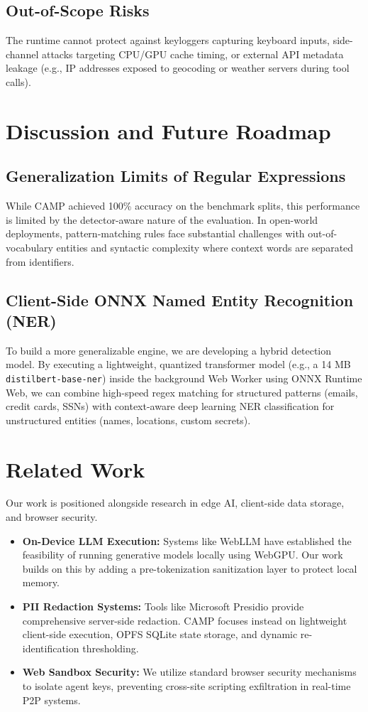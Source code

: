 \documentclass[conference]{IEEEtran}
\begin{document}
\subsection{Out-of-Scope Risks}
The runtime cannot protect against keyloggers capturing keyboard inputs, side-channel attacks targeting CPU/GPU cache timing, or external API metadata leakage (e.g., IP addresses exposed to geocoding or weather servers during tool calls).

\section{Discussion and Future Roadmap}

\subsection{Generalization Limits of Regular Expressions}
While CAMP achieved 100\% accuracy on the benchmark splits, this performance is limited by the detector-aware nature of the evaluation. In open-world deployments, pattern-matching rules face substantial challenges with out-of-vocabulary entities and syntactic complexity where context words are separated from identifiers.

\subsection{Client-Side ONNX Named Entity Recognition (NER)}
To build a more generalizable engine, we are developing a hybrid detection model. By executing a lightweight, quantized transformer model (e.g., a 14 MB \texttt{distilbert-base-ner}) inside the background Web Worker using ONNX Runtime Web, we can combine high-speed regex matching for structured patterns (emails, credit cards, SSNs) with context-aware deep learning NER classification for unstructured entities (names, locations, custom secrets).

\section{Related Work}

Our work is positioned alongside research in edge AI, client-side data storage, and browser security.
\begin{itemize}
    \item \textbf{On-Device LLM Execution:} Systems like WebLLM \cite{webllm} have established the feasibility of running generative models locally using WebGPU. Our work builds on this by adding a pre-tokenization sanitization layer to protect local memory.
    \item \textbf{PII Redaction Systems:} Tools like Microsoft Presidio \cite{presidio} provide comprehensive server-side redaction. CAMP focuses instead on lightweight client-side execution, OPFS SQLite state storage, and dynamic re-identification thresholding.
    \item \textbf{Web Sandbox Security:} We utilize standard browser security mechanisms \cite{webrtcsec} to isolate agent keys, preventing cross-site scripting exfiltration in real-time P2P systems.
\end{itemize}
\end{document}
